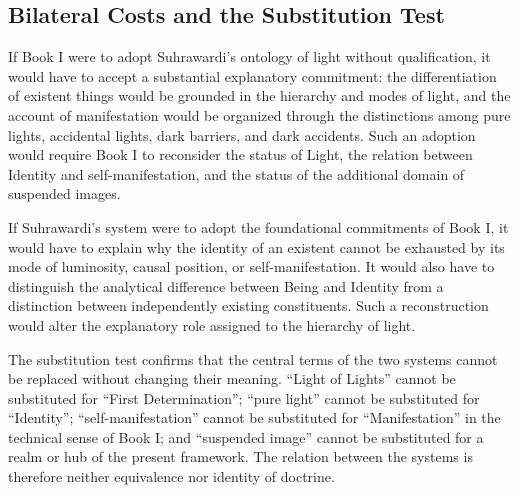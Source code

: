 
\subsection{Bilateral Costs and the Substitution Test}
\label{sec:ch08-s14-ss19}

\label{para:VS.B01.P01.C08.S14.SS19.P001}

If Book I were to adopt Suhrawardi's ontology
of light without qualification,
it would have to accept a
substantial explanatory commitment:
the differentiation of existent
things would be grounded in
the hierarchy and modes of
light, and the account of
manifestation would be
organized through the
distinctions among pure
lights, accidental lights,
dark barriers, and dark
accidents. Such an adoption
would require Book I to
reconsider the status of
Light, the relation between
Identity and self-manifestation,
and the status of the
additional domain of
suspended images.

\label{para:VS.B01.P01.C08.S14.SS19.P002}

If Suhrawardi's system were to adopt
the foundational commitments
of Book I, it would have
to explain why the identity
of an existent cannot be
exhausted by its mode of
luminosity, causal position,
or self-manifestation.
It would also have to
distinguish the analytical
difference between Being
and Identity from a
distinction between
independently existing
constituents. Such a
reconstruction would
alter the explanatory
role assigned to the
hierarchy of light.

\label{para:VS.B01.P01.C08.S14.SS19.P003}

The substitution test confirms that
the central terms of the
two systems cannot be
replaced without changing
their meaning. ``Light
of Lights'' cannot be
substituted for ``First
Determination''; ``pure
light'' cannot be
substituted for ``Identity'';
``self-manifestation''
cannot be substituted
for ``Manifestation'' in
the technical sense of
Book I; and ``suspended
image'' cannot be
substituted for a realm
or hub of the present
framework. The relation
between the systems is
therefore neither
equivalence nor identity
of doctrine.

